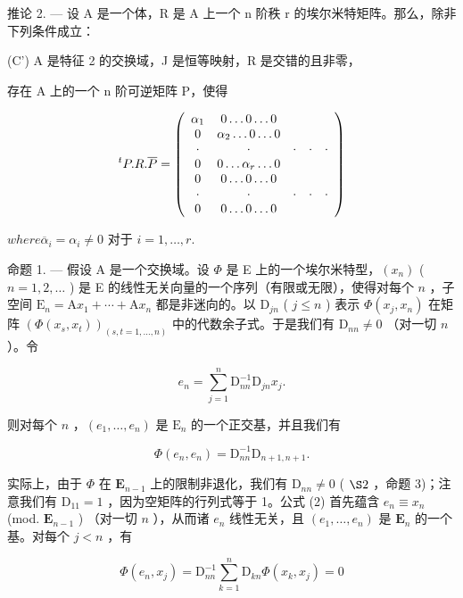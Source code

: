 推论 2. --- 设 A 是一个体，R 是 A 上一个 n 阶秩 r 的埃尔米特矩阵。那么，除非下列条件成立：

(C') A 是特征 2 的交换域，J 是恒等映射，R 是交错的且非零，

存在 A 上的一个 n 阶可逆矩阵 P，使得

\[
{ } ^ { t } P . R . \overline { { P } } = \left( \begin{array} { c c c c c } \alpha _ { 1 } & 0 \dots 0 \dots 0 \\ 0 & \alpha _ { 2 } \dots 0 \dots 0 \\ \cdot & \cdot & \cdot & \cdot & \cdot \\ 0 & 0 \dots \alpha _ { r } \dots 0 \\ 0 & 0 \dots 0 \dots 0 \\ \cdot & \cdot & \cdot & \cdot & \cdot \\ 0 & 0 \dots 0 \dots 0 \end{array} \right)
\]

\(where \overline{\alpha}_{i} = \alpha_{i} \neq 0 \text{ 对于 } i = 1, \ldots, r.\)

命题 1. --- 假设 A 是一个交换域。设 \(\Phi\) 是 E 上的一个埃尔米特型，\((x_{n})\) ( \(n=1,2,\ldots\) ) 是 E 的线性无关向量的一个序列（有限或无限），使得对每个 \(n\) ，子空间 \(\mathrm{E}_{n}=\mathrm{A}x_{1}+\cdots+\mathrm{A}x_{n}\) 都是非迷向的。以 \(\mathrm{D}_{jn}\) ( \(j\leqslant n\) ) 表示 \(\Phi(x_{j},x_{n})\) 在矩阵 \((\Phi(x_{s},x_{t}))_{(s,t=1,\ldots,n)}\) 中的代数余子式。于是我们有 \(\mathrm{D}_{nn}\neq0\) （对一切 \(n\) ）。令

\[
e _ {n} = \sum_ {j = 1} ^ {n} \mathrm{D} _ {n n} ^ {- 1} \mathrm{D} _ {j n} x _ {j}.\tag{2}
\]

则对每个 \(n\) ，\((e_{1},\ldots,e_{n})\) 是 \(\mathrm{E}_{n}\) 的一个正交基，并且我们有

\[
\Phi (e _ {n}, e _ {n}) = \mathrm{D} _ {n n} ^ {- 1} \mathrm{D} _ {n + 1, n + 1}.\tag{3}
\]

实际上，由于 \(\Phi\) 在 \(\mathbf{E}_{n-1}\) 上的限制非退化，我们有 \(\mathrm{D}_{nn} \neq 0\) ( \(\S 2\) ，命题 3)；注意我们有 \(\mathrm{D}_{11} = 1\) ，因为空矩阵的行列式等于 1。公式 (2) 首先蕴含 \(e_n \equiv x_n\) (mod. \(\mathbf{E}_{n-1}\) ) （对一切 \(n\) ），从而诸 \(e_n\) 线性无关，且 \((e_1, \ldots, e_n)\) 是 \(\mathbf{E}_n\) 的一个基。对每个 \(j < n\) ，有

\[
\Phi (e _ {n}, x _ {j}) = \mathrm{D} _ {n n} ^ {- 1} \sum_ {k = 1} ^ {n} \mathrm{D} _ {k n} \Phi (x _ {k}, x _ {j}) = 0
\]

